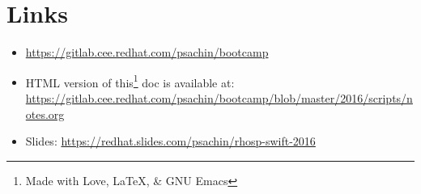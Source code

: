 \documentclass{article}
\begin{document}
\section{Links}
\label{sec:orgheadline8}
\begin{itemize}
\item \url{https://gitlab.cee.redhat.com/psachin/bootcamp}
\item HTML version of this\footnote[1]{Made with Love, \LaTeX, \& GNU Emacs} doc is available at: \newline
     \url{https://gitlab.cee.redhat.com/psachin/bootcamp/blob/master/2016/scripts/notes.org}
\item Slides: \url{https://redhat.slides.com/psachin/rhosp-swift-2016}
\end{itemize}
\end{document}
